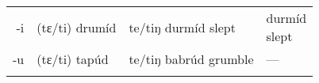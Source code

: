 \documentclass[output=paper,colorlinks,citecolor=brown]{langscibook}
\begin{document}
\begin{table}[H]
\begin{tabularx}{\textwidth}{rQQQ}
{  -i} & {(tɛ/ti) drumíd} & {te/tiŋ durmíd} {slept}{} & {durmíd \newline slept}{}\\
{ -u} & {(tɛ/ti) tapúd} & {te/tiŋ babrúd} {grumble}{} & { ---}\\
\lspbottomrule
\end{tabularx}

\end{table}


\label{sec:clements:Appendix-B}
\end{document}
